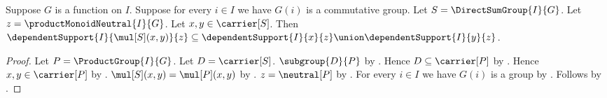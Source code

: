 \begin{proposition}\label{direct_sum_group_mul_support}
    Suppose $G$ is a function on $I$.
    Suppose for every $i\in I$ we have $G(i)$ is a commutative group.
    Let $S=\DirectSumGroup{I}{G}$.
    Let $z=\productMonoidNeutral{I}{G}$.
    Let $x,y\in\carrier[S]$.
    Then
        $\dependentSupport{I}{\mul[S](x,y)}{z}\subseteq
            \dependentSupport{I}{x}{z}\union
                \dependentSupport{I}{y}{z}$.
\end{proposition}
\begin{proof}
    Let $P=\ProductGroup{I}{G}$.
    Let $D=\carrier[S]$.
    $\subgroup{D}{P}$ by
        .
    Hence $D\subseteq\carrier[P]$ by .
    Hence $x,y\in\carrier[P]$ by .
    $\mul[S](x,y)=\mul[P](x,y)$ by
        .
    $z=\neutral[P]$ by
        .
    For every $i\in I$ we have $G(i)$ is a group by
        .
    Follows by .
\end{proof}

